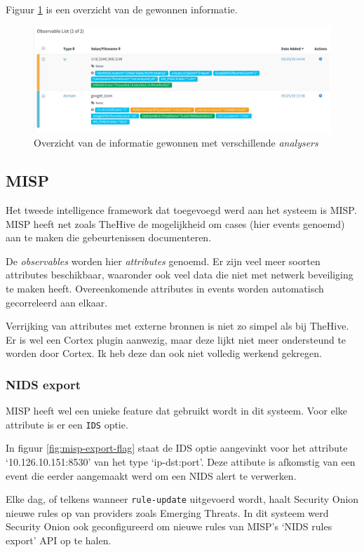 \documentclass[a4paper,12pt]{report}
\begin{document}
Figuur \ref{fig:thehive-example} is een overzicht van de gewonnen informatie.

\begin{figure}[H]
  \centering
  \includegraphics[width=\textwidth]{thehive-example}
  \caption{Overzicht van de informatie gewonnen met verschillende \emph{analysers}}
  \label{fig:thehive-example}
\end{figure}

\subsection{MISP}
Het tweede intelligence framework dat toegevoegd werd aan het systeem is MISP.
MISP heeft net zoals TheHive de mogelijkheid om cases (hier events genoemd) aan te maken die gebeurtenissen documenteren.

De \emph{observables} worden hier \emph{attributes} genoemd.
Er zijn veel meer soorten attributes beschikbaar, waaronder ook veel data die niet met netwerk beveiliging te maken heeft.
Overeenkomende attributes in events worden automatisch gecorreleerd aan elkaar.

Verrijking van attributes met externe bronnen is niet zo simpel als bij TheHive.
Er is wel een Cortex plugin aanwezig, maar deze lijkt niet meer ondersteund te worden door Cortex.
Ik heb deze dan ook niet volledig werkend gekregen.

\subsubsection{NIDS export}
\label{sec:misp-nids-export}
MISP heeft wel een unieke feature dat gebruikt wordt in dit systeem.
Voor elke attribute is er een \lstinline|IDS| optie.

In figuur \ref{fig:misp-export-flag} staat de IDS optie aangevinkt voor het attribute `10.126.10.151:8530' van het type `ip-dst:port'.
Deze attibute is afkomstig van een event die eerder aangemaakt werd om een NIDS alert te verwerken.

Elke dag, of telkens wanneer \lstinline|rule-update| uitgevoerd wordt, haalt Security Onion nieuwe rules op van providers zoals Emerging Threats.
In dit systeem werd Security Onion ook geconfigureerd om nieuwe rules van MISP's `NIDS rules export' API op te halen.
\end{document}
